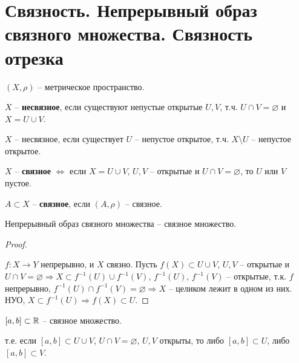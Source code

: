 
\section{Связность. Непрерывный образ связного множества. Связность отрезка \href{https://youtu.be/E7inz4tp-6k?t=6544}{\Walley}}


\begin{conj}
    $(X, \rho)$ -- метрическое пространство.
    
    $X$ -- \textbf{несвязное}, если существуют непустые открытые $U, V$, 
    т.ч. $U \cap V = \varnothing$ и $X = U \cup V$.
\end{conj}

\notice $X$ -- несвязное, если существует $U$ -- непустое
открытое, т.ч. $X \setminus U$ -- непустое открытое.

\begin{conj}
    $X$ -- \textbf{связное} $\Longleftrightarrow$ если $X = U \cup V$, 
    $U, V$ -- открытые и $U \cap V = \varnothing$, то $U$ или $V$ пустое.
\end{conj}

\begin{conj}
    $A \subset X$ -- \textbf{связное}, если $(A, \rho)$ -- связное.
\end{conj}

\begin{theorem-non}
    Непрерывный образ связного множества -- связное множество.
\end{theorem-non}
\begin{proof} $ $

    $f: X \rightarrow Y$ непрерывно, и $X$ связно. Пусть $f(X) \subset
    U \cup V$, $U, V$ -- открытые и $U \cap V = \varnothing \Rightarrow
    X \subset f^{-1}(U) \cup f^{-1}(V)$, $f^{-1}(U)$, $f^{-1}(V)$ --
    открытые, т.к. $f$ непрерывно, $f^{-1}(U) \cap f^{-1}(V) =
    \varnothing \Rightarrow X$ -- целиком лежит в одном из них.
    НУО, $X \subset f^{-1}(U) \Rightarrow f(X) \subset U$.
\end{proof}

\begin{theorem-non}
$[a, b] \subset \mathbb{R}$ -- связное множество.
\end{theorem-non}
т.е. если $[a, b] \subset U \cup V$, $U \cap V = \varnothing$, $U, V$
открыты, то либо $[a, b] \subset U$, либо $[a, b] \subset V$.

